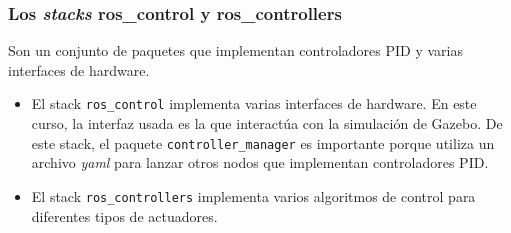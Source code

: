 \begin{frame}\frametitle{Los \textit{stacks} ros\_control y ros\_controllers}
  Son un conjunto de paquetes que implementan controladores PID y varias interfaces de hardware.
  \begin{itemize}
  \item El stack \texttt{ros\_control} implementa varias interfaces de hardware. En este curso, la interfaz usada es la que interactúa con la simulación de Gazebo. De este stack, el paquete \texttt{controller\_manager} es importante porque utiliza un archivo \textit{yaml} para lanzar otros nodos que implementan controladores PID. 
  \item El stack \texttt{ros\_controllers} implementa varios algoritmos de control para diferentes tipos de actuadores. 
  \end{itemize}
\end{frame}
